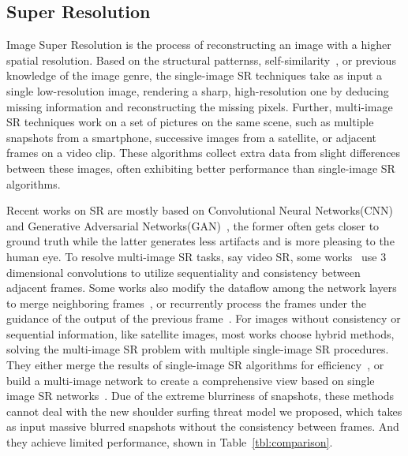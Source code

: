 \subsection{Super Resolution}
Image Super Resolution is the process of reconstructing an image with a higher spatial resolution. Based on the structural patternss, self-similarity~\cite{suetake2008image}, or previous knowledge of the image genre, the single-image SR techniques take as input a single low-resolution image, rendering a sharp, high-resolution one by deducing missing information and reconstructing the missing pixels. Further, multi-image SR techniques work on a set of pictures on the same scene, such as multiple snapshots from a smartphone, successive images from a satellite, or adjacent frames on a video clip. These algorithms collect extra data from slight differences between these images, often exhibiting better performance than single-image SR algorithms.

Recent works on SR are mostly based on Convolutional Neural Networks(CNN)~\cite{dong2015image} and Generative Adversarial Networks(GAN)~\cite{ledig2017photo}, the former often gets closer to ground truth while the latter generates less artifacts and is more pleasing to the human eye. To resolve multi-image SR tasks, say video SR, some works~\cite{shi2016real,kappeler2016video} use 3 dimensional convolutions to utilize sequentiality and consistency between adjacent frames. Some works also modify the dataflow among the network layers to merge neighboring frames~\cite{huang2017video}, or recurrently process the frames under the guidance of the output of the previous frame~\cite{sajjadi2018frame}. For images without consistency or sequential information, like satellite images, most works choose hybrid methods, solving the multi-image SR problem with multiple single-image SR procedures. They either merge the results of single-image SR algorithms for efficiency~\cite{kawulok2019deep}, or build a multi-image network to create a comprehensive view based on single image SR networks~\cite{8834937}. Due of the extreme blurriness of snapshots, these methods cannot deal with the new shoulder surfing threat model we proposed, which takes as input massive blurred snapshots without the consistency between frames. And they achieve limited performance, shown in Table~\ref{tbl:comparison}.

